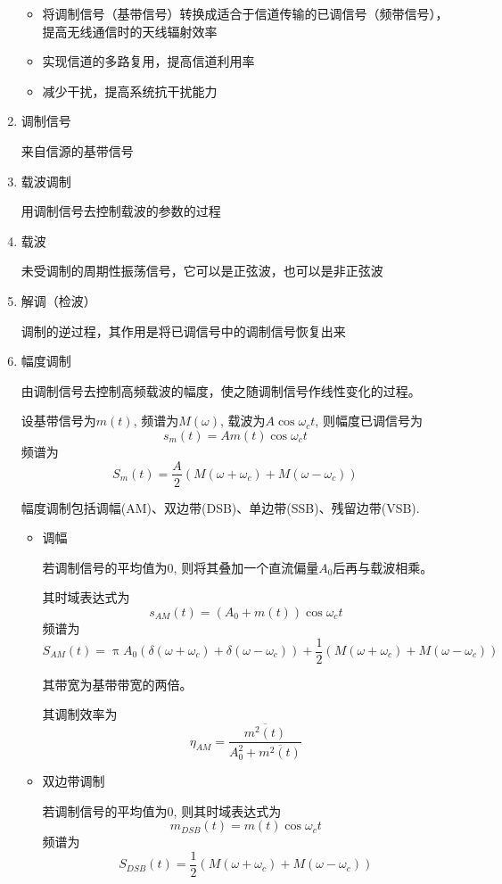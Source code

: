 \documentclass[UTF8]{ctexrep}
\def\pth#1{\left( {#1}\right)}
\begin{document}
\begin{enumerate}
\begin{itemize}
\item 将调制信号（基带信号）转换成适合于信道传输的已调信号（频带信号），提高无线通信时的天线辐射效率
\item 实现信道的多路复用，提高信道利用率
\item 减少干扰，提高系统抗干扰能力
\end{itemize}
\item 调制信号\par
来自信源的基带信号
\item 载波调制\par
用调制信号去控制载波的参数的过程
\item 载波\par
未受调制的周期性振荡信号，它可以是正弦波，也可以是非正弦波
\item 解调（检波）\par
调制的逆过程，其作用是将已调信号中的调制信号恢复出来
\item 幅度调制\par
由调制信号去控制高频载波的幅度，使之随调制信号作线性变化的过程。\par
设基带信号为$m(t)$, 频谱为$M(\omega)$, 载波为$A\cos\omega_c t$, 则幅度已调信号为
\[s_m(t)=Am(t)\cos\omega_ct\]
频谱为
\[S_m(t)=\frac{A}{2}\pth{M\pth{\omega + \omega_c}+M\pth{\omega-\omega_c}}\]

幅度调制包括调幅(AM)、双边带(DSB)、单边带(SSB)、残留边带(VSB).
\begin{itemize}
\item 调幅\par
若调制信号的平均值为$0$, 则将其叠加一个直流偏量$A_0$后再与载波相乘。\par
其时域表达式为
\[s_{AM}(t)=\pth{A_0+m(t)}\cos\omega_ct\]
频谱为
\[S_{AM}(t)=\uppi A_0\pth{\delta\pth{\omega+\omega_c}+\delta\pth{\omega -\omega_c}}+\frac{1}{2}\pth{M\pth{\omega+\omega_c}+M\pth{\omega -\omega_c}}\]

其带宽为基带带宽的两倍。\par
其调制效率为
\[\eta_{AM}=\frac{\overline{m^2(t)}}{A_0^2+\overline{m^2(t)}}\]
\item 双边带调制\par
若调制信号的平均值为$0$, 则其时域表达式为
\[m_{DSB}(t)=m(t)\cos\omega_c t\]
频谱为
\[S_{DSB}(t)=\frac{1}{2}\pth{M\pth{\omega+\omega_c}+M\pth{\omega -\omega_c}}\]


\end{itemize}
\end{enumerate}
\end{document}
